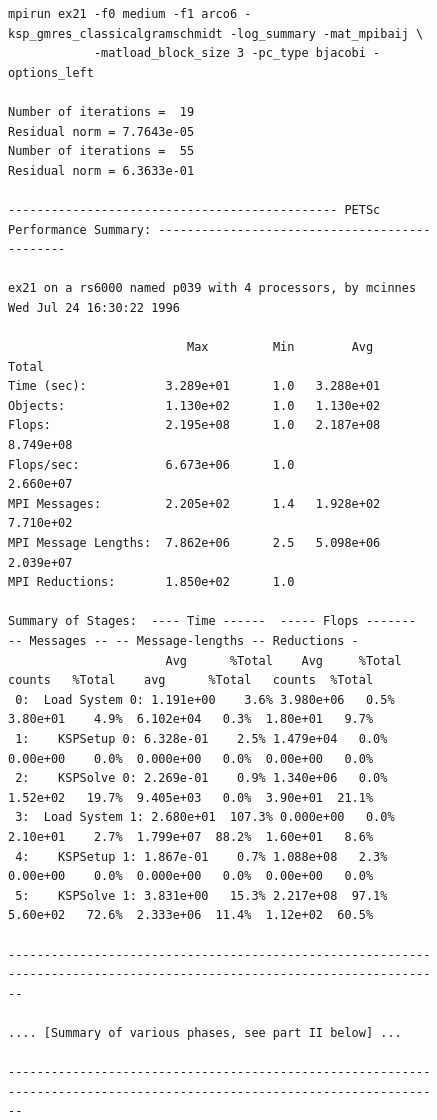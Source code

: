 \begin{figure}[tb]
{\tiny
\begin{verbatim}
mpirun ex21 -f0 medium -f1 arco6 -ksp_gmres_classicalgramschmidt -log_summary -mat_mpibaij \
            -matload_block_size 3 -pc_type bjacobi -options_left

Number of iterations =  19
Residual norm = 7.7643e-05
Number of iterations =  55
Residual norm = 6.3633e-01

---------------------------------------------- PETSc Performance Summary: ----------------------------------------------

ex21 on a rs6000 named p039 with 4 processors, by mcinnes Wed Jul 24 16:30:22 1996

                         Max         Min        Avg        Total 
Time (sec):           3.289e+01      1.0   3.288e+01
Objects:              1.130e+02      1.0   1.130e+02
Flops:                2.195e+08      1.0   2.187e+08   8.749e+08
Flops/sec:            6.673e+06      1.0               2.660e+07
MPI Messages:         2.205e+02      1.4   1.928e+02   7.710e+02
MPI Message Lengths:  7.862e+06      2.5   5.098e+06   2.039e+07
MPI Reductions:       1.850e+02      1.0

Summary of Stages:  ---- Time ------  ----- Flops -------  -- Messages -- -- Message-lengths -- Reductions -
                      Avg      %Total    Avg     %Total   counts   %Total    avg      %Total   counts  %Total 
 0:  Load System 0: 1.191e+00    3.6% 3.980e+06   0.5%  3.80e+01    4.9%  6.102e+04   0.3%  1.80e+01   9.7% 
 1:    KSPSetup 0: 6.328e-01    2.5% 1.479e+04   0.0%  0.00e+00    0.0%  0.000e+00   0.0%  0.00e+00   0.0% 
 2:    KSPSolve 0: 2.269e-01    0.9% 1.340e+06   0.0%  1.52e+02   19.7%  9.405e+03   0.0%  3.90e+01  21.1% 
 3:  Load System 1: 2.680e+01  107.3% 0.000e+00   0.0%  2.10e+01    2.7%  1.799e+07  88.2%  1.60e+01   8.6% 
 4:    KSPSetup 1: 1.867e-01    0.7% 1.088e+08   2.3%  0.00e+00    0.0%  0.000e+00   0.0%  0.00e+00   0.0% 
 5:    KSPSolve 1: 3.831e+00   15.3% 2.217e+08  97.1%  5.60e+02   72.6%  2.333e+06  11.4%  1.12e+02  60.5% 

------------------------------------------------------------------------------------------------------------------------

.... [Summary of various phases, see part II below] ...

------------------------------------------------------------------------------------------------------------------------


\end{verbatim}}
\end{figure}
